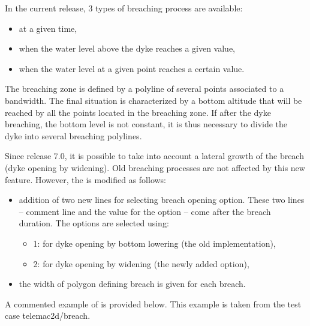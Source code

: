 In the current release, 3 types of breaching process are available:

\begin{itemize}
\item at a given time,

\item when the water level above the dyke reaches a given value,

\item when the water level at a given point reaches a certain value.
\end{itemize}

The breaching zone is defined by a polyline of several points associated to a
bandwidth.
The final situation is characterized by a bottom altitude that will be reached
by all the points located in the breaching zone.
If after the dyke breaching, the bottom level is not constant, it is thus
necessary to divide the dyke into several breaching polylines.

Since release 7.0, it is possible to take into account a lateral growth
of the breach (dyke opening by widening).
Old breaching processes are not affected by this new feature.
However, the  is modified as follows:

\begin{itemize}
\item addition of two new lines for selecting breach opening option.
These two lines -- comment line and the value for the option -- come after
the breach duration. The options are selected using:
\begin{itemize}
\item 1: for dyke opening by bottom lowering (the old implementation),

\item 2: for dyke opening by widening (the newly added option),

\end{itemize}
\item the width of polygon defining breach is given for each breach.
\end{itemize}

A commented example of  is provided below.
This example is taken from the test case telemac2d/breach.

